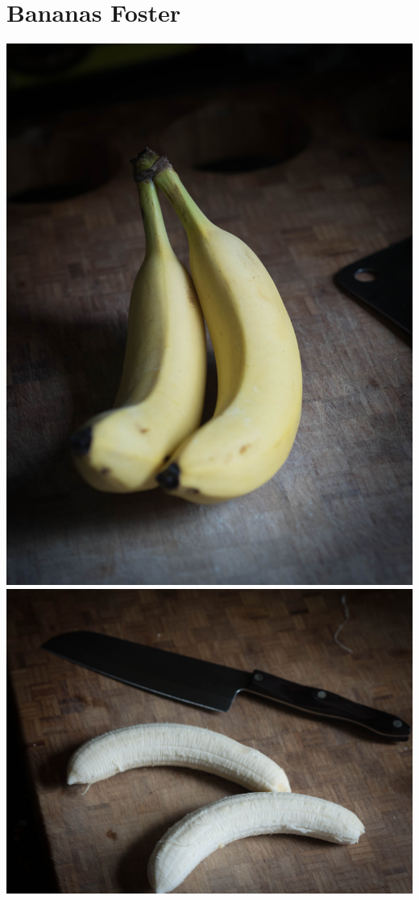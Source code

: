 \chapter*{Bananas Foster}
\renewcommand{\chaptertitle}{Bananas Foster}

\includegraphics[height=\textwidth-1.3in]{food/bananas-foster/images/hi-res/01.jpg}
\newpage
\includegraphics[width=\textwidth]{food/bananas-foster/images/hi-res/02.jpg}
